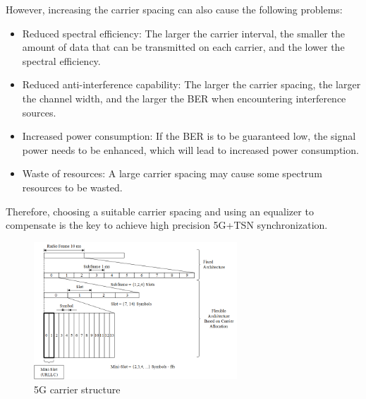 \documentclass[english]{cccconf}
\begin{document}
However, increasing the carrier spacing can also cause the following problems:
\begin{itemize}
	\item Reduced spectral efficiency: The larger the carrier interval, the smaller the amount of data that can be transmitted on each carrier, and the lower the spectral efficiency.
	
	\item Reduced anti-interference capability: The larger the carrier spacing, the larger the channel width, and the larger the BER when encountering interference sources.
	
	\item Increased power consumption: If the BER is to be guaranteed low, the signal power needs to be enhanced, which will lead to increased power consumption.
	
	\item Waste of resources: A large carrier spacing may cause some spectrum resources to be wasted.
\end{itemize}
Therefore, choosing a suitable carrier spacing and using an equalizer to compensate is the key to achieve high precision 5G+TSN synchronization.


\begin{figure}[htbp]
	\centering
	\setcounter{figure}{2}
	\includegraphics[width=3in]{fig14.png}
	\caption{5G carrier structure}
\end{figure}
\end{document}

